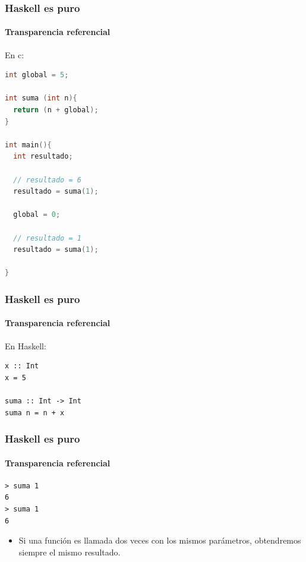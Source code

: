 \documentclass{beamer}
\begin{document}

\begin{frame}[fragile]
  \frametitle{Haskell es puro}
  \framesubtitle{Transparencia referencial}

En c: 

\vspace{0.3cm}

\begin{lstlisting}[language=c,basicstyle=\tiny]
int global = 5;

int suma (int n){
  return (n + global);
}

int main(){
  int resultado;
  
  // resultado = 6
  resultado = suma(1); 
  
  global = 0;
  
  // resultado = 1
  resultado = suma(1); 

}
\end{lstlisting}

\end{frame}


\begin{frame}[fragile]
  \frametitle{Haskell es puro}
  \framesubtitle{Transparencia referencial}

En Haskell: 

\begin{lstlisting}
x :: Int
x = 5

suma :: Int -> Int
suma n = n + x
\end{lstlisting}


\end{frame}


\begin{frame}[fragile]
  \frametitle{Haskell es puro}
  \framesubtitle{Transparencia referencial}

\begin{lstlisting}[numbers=none, backgroundcolor=\color{lightgray}, keywordstyle=\color{black}]
> suma 1
6
> suma 1
6
\end{lstlisting}

\begin{itemize}
\item Si una función es llamada dos veces con los mismos parámetros, obtendremos siempre el mismo resultado.
\end{itemize}

\end{frame}
\end{document}
